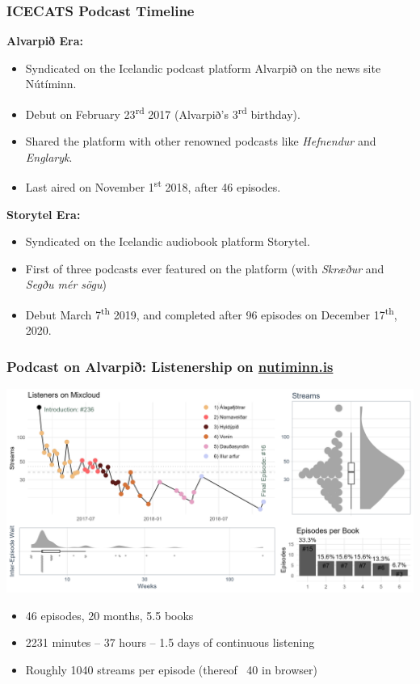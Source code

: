 \begin{frame}
    \frametitle{ICECATS Podcast Timeline}

    \textbf{Alvarpið Era:}
    \begin{itemize}
        \item Syndicated on the Icelandic podcast platform Alvarpið on the news site Nútíminn.
        \item Debut on February 23\textsuperscript{rd} 2017 (Alvarpið's 3\textsuperscript{rd} birthday).
        \item Shared the platform with other renowned podcasts like \emph{Hefnendur} and \emph{Englaryk}.
        \item Last aired on November 1\textsuperscript{st} 2018, after 46 episodes.
    \end{itemize}

    \textbf{Storytel Era:}
    \begin{itemize}
        \item Syndicated on the Icelandic audiobook platform Storytel.
        \item First of three podcasts ever featured on the platform
        (with \emph{Skræður} and \emph{Segðu mér sögu})
        \item Debut March 7\textsuperscript{th} 2019, and completed after
        96 episodes on December 17\textsuperscript{th}, 2020.
    \end{itemize}

\end{frame}


\begin{frame}
    \frametitle{Podcast on Alvarpið: Listenership on \url{nutiminn.is}}
    \includegraphics[width=\textwidth]{../R/figures/alvarpid_listeners.png}

    \begin{itemize}
        \item 46 episodes, 20 months, 5.5 books
        \item 2231 minutes -- 37 hours -- 1.5 days of continuous listening
        \item Roughly 1040 streams per episode (thereof ~40 in browser)
    \end{itemize}

\end{frame}


